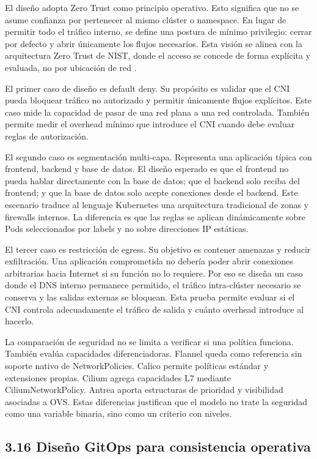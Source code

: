 \documentclass[journal]{IEEEtran}
\begin{document}
El diseño adopta Zero Trust como principio operativo. Esto significa que no se asume confianza por pertenecer al mismo clúster o namespace. En lugar de permitir todo el tráfico interno, se define una postura de mínimo privilegio: cerrar por defecto y abrir únicamente los flujos necesarios. Esta visión se alinea con la arquitectura Zero Trust de NIST, donde el acceso se concede de forma explícita y evaluada, no por ubicación de red \cite{ref24,ref25}.

El primer caso de diseño es default deny. Su propósito es validar que el CNI pueda bloquear tráfico no autorizado y permitir únicamente flujos explícitos. Este caso mide la capacidad de pasar de una red plana a una red controlada. También permite medir el overhead mínimo que introduce el CNI cuando debe evaluar reglas de autorización.

El segundo caso es segmentación multi-capa. Representa una aplicación típica con frontend, backend y base de datos. El diseño esperado es que el frontend no pueda hablar directamente con la base de datos; que el backend solo reciba del frontend; y que la base de datos solo acepte conexiones desde el backend. Este escenario traduce al lenguaje Kubernetes una arquitectura tradicional de zonas y firewalls internos. La diferencia es que las reglas se aplican dinámicamente sobre Pods seleccionados por labels y no sobre direcciones IP estáticas.

El tercer caso es restricción de egress. Su objetivo es contener amenazas y reducir exfiltración. Una aplicación comprometida no debería poder abrir conexiones arbitrarias hacia Internet si su función no lo requiere. Por eso se diseña un caso donde el DNS interno permanece permitido, el tráfico intra-clúster necesario se conserva y las salidas externas se bloquean. Esta prueba permite evaluar si el CNI controla adecuadamente el tráfico de salida y cuánto overhead introduce al hacerlo.

La comparación de seguridad no se limita a verificar si una política funciona. También evalúa capacidades diferenciadoras. Flannel queda como referencia sin soporte nativo de NetworkPolicies. Calico permite políticas estándar y extensiones propias. Cilium agrega capacidades L7 mediante CiliumNetworkPolicy. Antrea aporta estructuras de prioridad y visibilidad asociadas a OVS. Estas diferencias justifican que el modelo no trate la seguridad como una variable binaria, sino como un criterio con niveles.

\subsection{3.16 Diseño GitOps para consistencia operativa}
\end{document}
